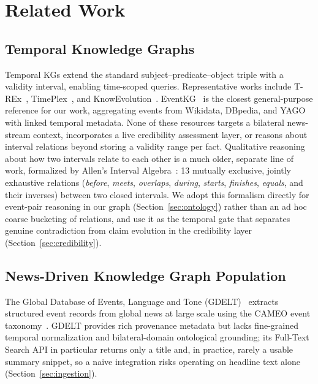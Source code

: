 \documentclass[conference]{IEEEtran}
\begin{document}
\section{Related Work}
\label{sec:related}

\subsection{Temporal Knowledge Graphs}

Temporal KGs extend the standard subject--predicate--object triple with a
validity interval, enabling time-scoped queries. Representative works
include T-REx~\cite{elsahar2018trex}, TimePlex~\cite{jain2020timeplex},
and Know\-Evolution~\cite{trivedi2019dyrep}. EventKG~\cite{gottschalk2019eventkg}
is the closest general-purpose reference for our work, aggregating events
from Wikidata, DBpedia, and YAGO with linked temporal metadata.
None of these resources targets a bilateral news-stream context, incorporates
a live credibility assessment layer, or reasons about interval relations
beyond storing a validity range per fact. Qualitative reasoning about how
two intervals relate to each other is a much older, separate line of work,
formalized by Allen's Interval Algebra~\cite{allen1983interval}: 13
mutually exclusive, jointly exhaustive relations (\emph{before}, \emph{meets},
\emph{overlaps}, \emph{during}, \emph{starts}, \emph{finishes}, \emph{equals},
and their inverses) between two closed intervals. We adopt this formalism
directly for event-pair reasoning in our graph (Section~\ref{sec:ontology})
rather than an ad hoc coarse bucketing of relations, and use it as the
temporal gate that separates genuine contradiction from claim evolution in
the credibility layer (Section~\ref{sec:credibility}).

\subsection{News-Driven Knowledge Graph Population}

The Global Database of Events, Language and Tone
(GDELT)~\cite{leetaru2013gdelt} extracts structured event records from
global news at large scale using the CAMEO event taxonomy~\cite{gerner2002cameo}.
GDELT provides rich provenance metadata but lacks fine-grained temporal
normalization and bilateral-domain ontological grounding; its Full-Text
Search API in particular returns only a title and, in practice, rarely a
usable summary snippet, so a naive integration risks operating on headline
text alone (Section~\ref{sec:ingestion}).
\end{document}
